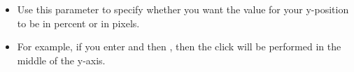 % 
\begin{itemize}
\item Use this parameter to specify whether you want the value for your y-position to be in percent or in pixels.
\item For example, if you enter  and then , then the click will be performed in the middle of the y-axis.
\end{itemize}